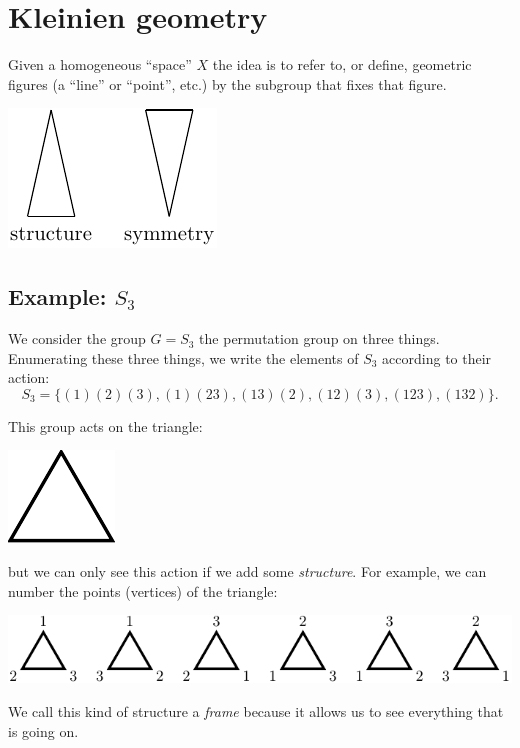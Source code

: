 \documentclass[11pt,oneside]{article}
\begin{document}
\section{Kleinien geometry}

Given a homogeneous ``space'' $X$ 
the idea is to refer to, or define, geometric 
figures (a ``line'' or ``point'', etc.)
by the subgroup that fixes that figure.

\begin{center}
\includegraphics[]{pic-structure.pdf} 
\end{center}

\subsection{Example: $S_3$}

We consider the group $G = S_3$ 
the permutation group on three things.
Enumerating these three things, we write
the elements of $S_3$ according to their
action:
$$
    S_3 = \bigl\{ (1)(2)(3), (1)(23), (13)(2), (12)(3), (123), (132) \bigr\}.
$$

This group acts on the triangle:
\begin{center}
\includegraphics[]{pic-triangle.pdf} 
\end{center}
but we can only see this action if we add some
\emph{structure}. 
For example, we can number the
points (vertices) of the triangle:
\begin{center}
\includegraphics[]{pic-triangle-numbered.pdf} 
\end{center}
We call this kind of structure a \emph{frame}
because it allows us to see everything that is going on.
\end{document}
